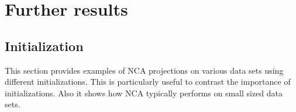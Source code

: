 \chapter{Further results}
\label{app:results}

\section{Initialization}
\label{app:sec:initialization}

This section provides examples of NCA projections on various data sets using different initializations. This is particularly useful to contrast the importance of initializations. Also it shows how NCA typically performs on small sized data sets. 


